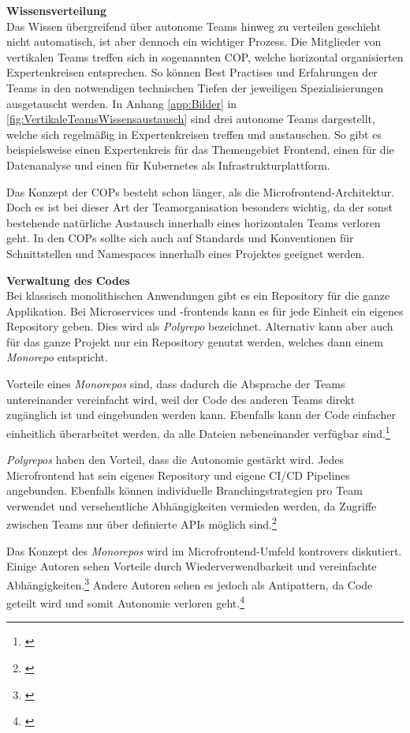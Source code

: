 \textbf{Wissensverteilung}\\
Das Wissen übergreifend über autonome Teams hinweg zu verteilen geschieht nicht automatisch, ist aber dennoch ein wichtiger Prozess. Die Mitglieder von vertikalen Teams treffen sich in sogenannten \gls{COP}, welche horizontal organisierten Expertenkreisen entsprechen. So können Best Practises und Erfahrungen der Teams in den notwendigen technischen Tiefen der jeweiligen Spezialisierungen ausgetauscht werden. In Anhang \ref{app:Bilder} in \cref{fig:VertikaleTeamsWissensaustausch} sind drei autonome Teams dargestellt, welche sich regelmäßig in Expertenkreisen treffen und austauschen. So gibt es beispielsweise einen Expertenkreis für das Themengebiet Frontend, einen für die Datenanalyse und einen für Kubernetes als Infrastrukturplattform.

Das Konzept der \gls{COP}s besteht schon länger, als die Microfrontend-Architektur. Doch es ist bei dieser Art der Teamorganisation besonders wichtig, da der sonst bestehende natürliche Austausch innerhalb eines horizontalen Teams verloren geht. In den \gls{COP}s sollte sich auch auf Standards und Konventionen für Schnittstellen und Namespaces innerhalb eines Projektes geeignet werden.

\textbf{Verwaltung des Codes}\\
Bei klassisch monolithischen Anwendungen gibt es ein Repository für die ganze Applikation. Bei Microservices und -frontends kann es für jede Einheit ein eigenes Repository geben. Dies wird als \textit{Polyrepo} bezeichnet. Alternativ kann aber auch für das ganze Projekt nur ein Repository genutzt werden, welches dann einem \textit{Monorepo} entspricht.

Vorteile eines \textit{Monorepos} sind, dass dadurch die Absprache der Teams untereinander vereinfacht wird, weil der Code des anderen Teams direkt zugänglich ist und eingebunden werden kann. Ebenfalls kann der Code einfacher einheitlich überarbeitet werden, da alle Dateien nebeneinander verfügbar sind.\footnote{\cite[vgl.][152\psqq]{Mezzalira2021}}

\textit{Polyrepos} haben den Vorteil, dass die Autonomie gestärkt wird. Jedes Microfrontend hat sein eigenes Repository und eigene \gls{CI/CD} Pipelines angebunden. Ebenfalls können individuelle Branchingstrategien pro Team verwendet und versehentliche Abhängigkeiten vermieden werden, da Zugriffe zwischen Teams nur über definierte \gls{API}s möglich sind.\footnote{\cite[vgl.][156\psqq]{Mezzalira2021}}

Das Konzept des \textit{Monorepos} wird im Microfrontend-Umfeld kontrovers diskutiert. Einige Autoren sehen Vorteile durch Wiederverwendbarkeit und vereinfachte Abhängigkeiten.\footnote{\cite[vgl.][152\psqq]{Mezzalira2021}} Andere Autoren sehen es jedoch als Antipattern, da Code geteilt wird und somit Autonomie verloren geht.\footnote{\cite[vgl.][258]{Geers2020}}

